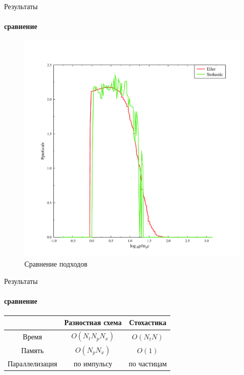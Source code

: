 \documentclass[8pt,pdf,hyperref={unicode},serif]{beamer}
\begin{document}
\begin{frame}{Результаты}
\framesubtitle{сравнение}
\begin{figure}[H]
\centering
\includegraphics[width=0.5\linewidth]{compare}
\caption{Сравнение подходов}
\end{figure}
\end{frame}
\begin{frame}{Результаты}
\framesubtitle{сравнение}
\begin{tabular}{|c|c|c|}
\hline
& Разностная схема & Стохастика \\ \hline
Время & $O(N_tN_pN_x)$ & $O(N_tN)$\\ \hline
Память & $O(N_pN_x)$ & $O(1)$\\ \hline
Параллелизация & по импульсу & по частицам\\ \hline
\end{tabular}
\end{frame}
\end{document}
